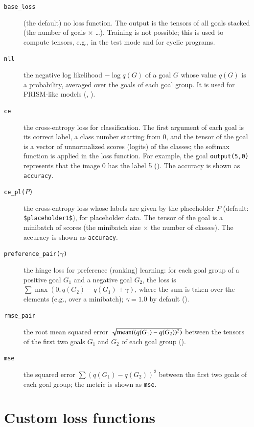\documentclass[a4paper]{report}
\begin{document}
\begin{description}
	\item[{\tt base\_loss}] (the default) no loss function.  The output is
	the tensors of all goals stacked (the number of goals $\times$ \ldots).
	Training is not possible; this is used to compute tensors, e.g., in the
	test mode and for cyclic programs.
	\item[{\tt nll}] the negative log likelihood $-\log q(G)$ of a goal $G$
	whose value $q(G)$ is a probability, averaged over the goals of each
	goal group.  It is used for PRISM-like models (, ).
	\item[{\tt ce}] the cross-entropy loss for classification.  The first
	argument of each goal is its correct label, a class number starting from
	0, and the tensor of the goal is a vector of unnormalized scores (logits)
	of the classes; the softmax function is applied in the loss function.
	For example, the goal {\tt output(5,0)} represents that the image 0 has
	the label 5 ().  The accuracy is shown as {\tt *accuracy}.
	\item[{\tt ce\_pl($P$)}] the cross-entropy loss whose labels are given by
	the placeholder $P$ (default: {\tt \$placeholder1\$}), for placeholder data.
	The tensor of the goal is a minibatch of scores (the minibatch size
	$\times$ the number of classes).  The accuracy is shown as {\tt *accuracy}.
	\item[{\tt preference\_pair($\gamma$)}] the hinge loss for preference
	(ranking) learning: for each goal group of a positive goal $G_1$ and a
	negative goal $G_2$, the loss is $\sum\max(0, q(G_2)-q(G_1)+\gamma)$,
	where the sum is taken over the elements (e.g., over a minibatch);
	$\gamma=1.0$ by default ().
	\item[{\tt rmse\_pair}] the root mean squared error
	$\sqrt{{\rm mean}((q(G_1)-q(G_2))^2)}$ between the tensors of the first
	two goals $G_1$ and $G_2$ of each goal group ().
	\item[{\tt mse}] the squared error $\sum(q(G_1)-q(G_2))^2$ between the
	first two goals of each goal group; the metric is shown as {\tt *mse}.
\end{description}

\section{Custom loss functions}
\label{sec:custom_loss}
\end{document}
